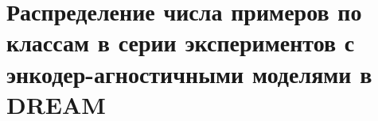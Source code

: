 \chapter{Распределение числа примеров по классам в серии экспериментов с энкодер-агностичными моделями в DREAM}
\label{appendix:dream-tr-ag-sizes}
\begin{table}[]
\caption{Pаспределение числа тренировочных примеров по классам в серии экспериментов с энкодер-агностичными моделями в DREAM. Глава~\ref{ch:mtldream}. Классификация эмоций.}
\label{appendix:emo_tr-ag}
\end{table}
\begin{table}[]
\caption{Pаспределение числа тренировочных примеров по классам в серии экспериментов с энкодер-агностичными моделями в DREAM. Глава~\ref{ch:mtldream}. Классификация тональности.}
\label{appendix:sentiment_tr-ag}
\end{table}

